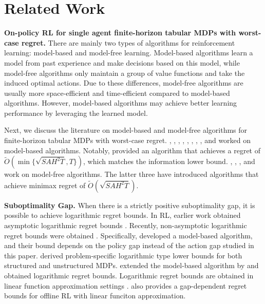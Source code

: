 \section{Related Work}
\label{related}
\textbf{On-policy RL for single agent finite-horizon tabular MDPs with worst-case regret.} There are mainly two types of algorithms for reinforcement learning: model-based and model-free learning. Model-based algorithms learn a model from past experience and make decisions based on this model, while model-free algorithms only maintain a group of value functions and take the induced optimal actions. Due to these differences, model-free algorithms are usually more space-efficient and time-efficient compared to model-based algorithms. However, model-based algorithms may achieve better learning performance by leveraging the learned model.

Next, we discuss the literature on model-based and model-free algorithms for finite-horizon tabular MDPs with worst-case regret. \citet{auer2008near}, \citet{agrawal2017optimistic}, \citet{azar2017minimax}, \citet{kakade2018variance}, \citet{agarwal2020model}, \citet{dann2019policy}, \citet{zanette2019tighter}, \citet{zhang2021reinforcement}, \citet{zhou2023sharp} and \citet{zhang2024settling} worked on model-based algorithms. Notably, \citet{zhang2024settling} provided an algorithm that achieves a regret of $\tilde{O}(\min \{\sqrt{SAH^2T},T\})$, which matches the information lower bound. \citet{jin2018q}, \citet{yang2021q}, \citet{zhang2020almost}, \citet{li2021breaking} and \citet{menard2021ucb} work on model-free algorithms. The latter three have introduced algorithms that achieve minimax regret of $\tilde{O}(\sqrt{SAH^2T})$.

\textbf{Suboptimality Gap.} When there is a strictly positive suboptimality gap, it is possible to achieve logarithmic regret
bounds. In RL, earlier work obtained asymptotic logarithmic regret bounds \citep{auer2007logarithmic,tewari2008optimistic}.
Recently, non-asymptotic logarithmic regret bounds were obtained \citep{jaksch2010near, ok2018exploration,simchowitz2019non, he2021logarithmic}. Specifically, \citet{jaksch2010near} developed a model-based algorithm, and their bound depends on the policy gap instead of the action gap studied in this paper. \citet{ok2018exploration} derived problem-specific logarithmic type lower bounds for both structured and unstructured MDPs. \citet{simchowitz2019non} extended the model-based algorithm by \citet{zanette2019tighter} and obtained logarithmic regret bounds. Logarithmic regret bounds are obtained in linear function approximation settings \citet{he2021logarithmic}. \citet{nguyen2023instance} also provides a gap-dependent regret bounds for offline RL with linear funciton approximation. 

